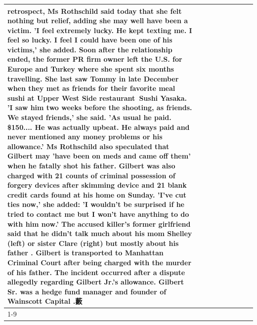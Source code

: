 \begin{table}[H]
\begin{tabular}{lllrlllll}
retrospect, Ms Rothschild said today that she felt nothing but relief, adding she may well have been a victim. 'I feel extremely lucky. He kept texting me. I feel so lucky. I feel I could have been one of his victims,' she added. Soon after the relationship ended, the former PR firm owner left the U.S. for Europe and Turkey where she spent six months  travelling. She last saw Tommy in late December when they met as friends for their favorite meal sushi at Upper West Side restaurant Sushi Yasaka. 'I saw him two weeks before the shooting, as friends. We stayed friends,' she said. 'As usual he paid. \$150.... He was actually upbeat. He always paid and never mentioned any money problems or his allowance.' Ms Rothschild also speculated that Gilbert may 'have been on meds and came off them' when he fatally shot his father. Gilbert was also charged with 21 counts of criminal possession of forgery devices after skimming device and 21 blank credit cards found at his home on Sunday. 'I've cut ties now,' she added: 'I wouldn’t be surprised if he tried to contact me but I won’t have anything to do with him now.' The accused killer's former girlfriend said that he didn't talk much about his mom Shelley (left) or sister Clare (right) but mostly about his father . Gilbert is transported to Manhattan Criminal Court  after being charged with the murder of his father. The incident occurred after a dispute allegedly regarding Gilbert Jr.'s allowance. Gilbert Sr. was a hedge fund manager and founder of Wainscott Capital .藪 \\
\cline{1-9} \cline{2-9}

\end{tabular}
\end{table}
